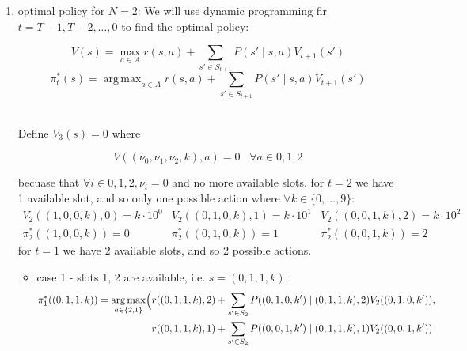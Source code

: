 \documentclass{assignmeownt}
\DeclareMathOperator*{\argmax}{arg\,max}
\begin{document}
\begin{enumerate}
\item optimal policy for $N=2$:
\newline
We will use dynamic programming fir $t=T-1, T-2, \dots, 0$ to find the optimal policy:
\begin{fleqn}
    \begin{equation}
        V(s) = \max_{a \in A}  r(s, a) + \sum_{s' \in S_{t+1}} P(s' \mid s, a) V_{t+1}(s')
    \end{equation}
    \begin{equation}
        \pi^*_t(s) = \argmax_{a \in A}  r(s, a) + \sum_{s' \in S_{t+1}} P(s' \mid s, a) V_{t+1}(s')
    \end{equation}
\end{fleqn}
\\ 
Define $V_3(s) = 0$ where 
\newline
\begin{fleqn}
    \begin{equation}
        V((\nu_0, \nu_1, \nu_2, k), a) = 0 \;\;\; \forall a \in {0, 1, 2}
    \end{equation}
\end{fleqn}
becuase that $\forall i \in {0, 1, 2}, \nu_i = 0$ and no more available slots.
\newline
for $t=2$ we have 1 available slot, and so only one possible action where $\forall k \in \{0, \dots, 9\}$:
\begin{equation}
    \begin{array}{ccc}
        V_2((1, 0, 0, k), 0) = k \cdot 10^0  & V_2((0, 1, 0, k), 1) = k \cdot 10^1 & V_2((0, 0, 1, k), 2) = k \cdot 10^2 \\
        \pi^*_2((1, 0, 0, k)) = 0 & \pi^*_2((0, 1, 0, k)) = 1 & \pi^*_2((0, 0, 1, k)) = 2
    \end{array}
\end{equation}
\newline
for $t=1$ we have 2 available slots, and so 2 possible actions.
\begin{itemize}
    \item{case 1 - slots 1, 2 are available, i.e. $s=(0, 1, 1, k)$:}
    \begin{equation}
        \begin{aligned}
            \pi^*_1((0, 1, 1, k)) = \argmax_{a \in \{2,1\}} \Bigl(
            &r((0, 1, 1, k), 2) + \sum_{s' \in S_2} P((0, 1, 0, k') \mid (0, 1, 1, k), 2) V_2((0, 1, 0, k')) , \\
            &r((0, 1, 1, k), 1) + \sum_{s' \in S_2} P((0, 0, 1, k') \mid (0, 1, 1, k), 1) V_2((0, 0, 1, k'))

\end{aligned}
\end{equation}
\end{itemize}
\end{enumerate}
\end{document}

